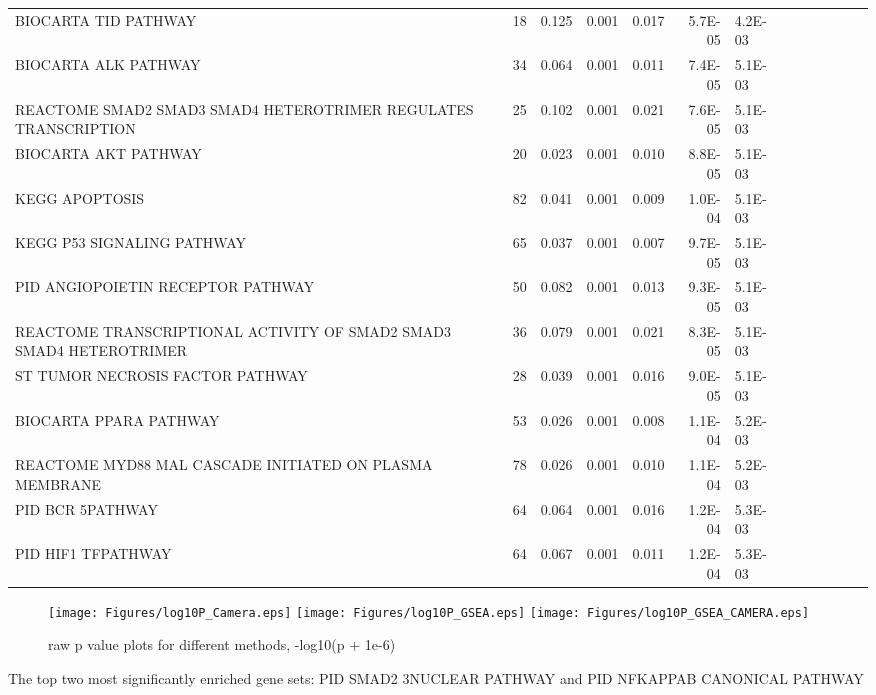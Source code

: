 \documentclass[11pt, a4paper]{article}
\begin{document}
{\begin{longtable}{p{3in}rp{0.5in}rp{0.5in}rp{0.5in}rp{0.5in}rp{0.5in}rp{0.5in}}
			BIOCARTA TID PATHWAY & 18 & 0.125 & 0.001 & 0.017 & 5.7E-05 & 4.2E-03 \\ 
			BIOCARTA ALK PATHWAY & 34 & 0.064 & 0.001 & 0.011 & 7.4E-05 & 5.1E-03 \\ 
			REACTOME SMAD2 SMAD3 SMAD4 HETEROTRIMER REGULATES TRANSCRIPTION & 25 & 0.102 & 0.001 & 0.021 & 7.6E-05 & 5.1E-03 \\ 
			BIOCARTA AKT PATHWAY & 20 & 0.023 & 0.001 & 0.010 & 8.8E-05 & 5.1E-03 \\ 
			KEGG APOPTOSIS & 82 & 0.041 & 0.001 & 0.009 & 1.0E-04 & 5.1E-03 \\ 
			KEGG P53 SIGNALING PATHWAY & 65 & 0.037 & 0.001 & 0.007 & 9.7E-05 & 5.1E-03 \\ 
			PID ANGIOPOIETIN RECEPTOR PATHWAY & 50 & 0.082 & 0.001 & 0.013 & 9.3E-05 & 5.1E-03 \\ 
			REACTOME TRANSCRIPTIONAL ACTIVITY OF SMAD2 SMAD3 SMAD4 HETEROTRIMER & 36 & 0.079 & 0.001 & 0.021 & 8.3E-05 & 5.1E-03 \\ 
			ST TUMOR NECROSIS FACTOR PATHWAY & 28 & 0.039 & 0.001 & 0.016 & 9.0E-05 & 5.1E-03 \\ 
			BIOCARTA PPARA PATHWAY & 53 & 0.026 & 0.001 & 0.008 & 1.1E-04 & 5.2E-03 \\ 
			REACTOME MYD88 MAL CASCADE INITIATED ON PLASMA MEMBRANE & 78 & 0.026 & 0.001 & 0.010 & 1.1E-04 & 5.2E-03 \\ 
			PID BCR 5PATHWAY & 64 & 0.064 & 0.001 & 0.016 & 1.2E-04 & 5.3E-03 \\ 
			PID HIF1 TFPATHWAY & 64 & 0.067 & 0.001 & 0.011 & 1.2E-04 & 5.3E-03 \\ 
			\hline
			\hline
		\end{longtable}
		}


		 	\begin{figure}[H]
		 		\caption{raw p value plots for different methods, -log10(p  + 1e-6)}\label{fig:HDdata}
		 		\begin{center}
		 			\texttt{[image: Figures/log10P\_Camera.eps]}
		 			\texttt{[image: Figures/log10P\_GSEA.eps]}
		 			\texttt{[image: Figures/log10P\_GSEA\_CAMERA.eps]}
		 		\end{center} 
		 	\end{figure} 
		 	
		 	The top two most significantly enriched gene sets: PID SMAD2 3NUCLEAR PATHWAY and  PID NFKAPPAB CANONICAL PATHWAY
		 	\cite{marcora2010huntington}
		 	
		 	
\end{document}
